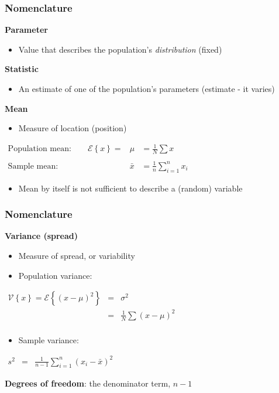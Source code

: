 \begin{frame}\frametitle{Nomenclature}
	\textbf{Parameter}
	\begin{itemize}
		\item	Value that describes the population's \emph{distribution} (fixed)
	\end{itemize}

	\textbf{Statistic}
	\begin{itemize}
		\item	An estimate of one of the population's parameters (estimate - it varies)
	\end{itemize}

	\textbf{Mean}
	\begin{itemize}
		\item	Measure of location (position)
	\end{itemize}

	$
	\begin{array}{rcl}
		\text{Population mean:} \qquad \mathcal{E}\left\{x \right\} = &\mu &= \displaystyle \frac{1}{N}\sum{x} \\
		\\
		\text{Sample mean:} \qquad &\bar{x} &= \displaystyle \frac{1}{n}\sum_{i=1}^{n}{x_i}
	\end{array}
	$
	\begin{itemize}
		\item	Mean by itself is not sufficient to describe a (random) variable
	\end{itemize}
\end{frame}

\begin{frame}\frametitle{Nomenclature}
	\textbf{Variance (spread)}
	\begin{itemize}
		\item	Measure of spread, or variability
		\item	Population variance:
	\end{itemize}

	$
	\begin{array}{rcl}
		\mathcal{V}\left\{x\right\} = \mathcal{E}\left\{ (x - \mu )^2\right\} &=& \sigma^2 \\
		&=& \displaystyle \frac{1}{N}\sum{(x-\mu)^2} \\
	\end{array}
	$
	\begin{itemize}
		\item	Sample variance:
	\end{itemize}
	$
	\begin{array}{rcl}
		s^2 &=& \displaystyle \frac{1}{n-1}\sum_{i=1}^{n}{(x_i - \bar{x})^2}
	\end{array}
	$

	\textbf{Degrees of freedom}: the denominator term, $n-1$
\end{frame}

